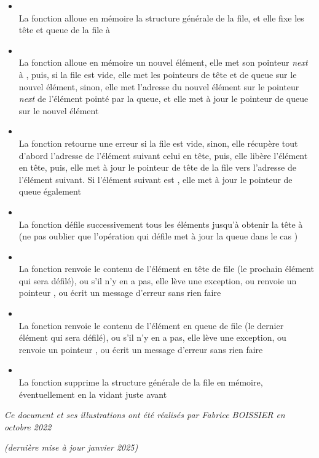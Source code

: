 \documentclass[11pt,a4paper]{article}
\begin{document}
\begin{itemize}
\item {}\\
      La fonction alloue en mémoire la structure générale de la file, et elle fixe les tête et queue de la file à 
\item {}\\
      La fonction alloue en mémoire un nouvel élément, elle met son pointeur \textit{next} à , puis, si la file est vide, elle met les pointeurs de tête et de queue sur le nouvel élément, sinon, elle met l'adresse du nouvel élément sur le pointeur \textit{next} de l'élément pointé par la queue, et elle met à jour le pointeur de queue sur le nouvel élément
\item {}\\
      La fonction retourne une erreur si la file est vide, sinon, elle récupère tout d'abord l'adresse de l'élément suivant celui en tête, puis, elle libère l'élément en tête, puis, elle met à jour le pointeur de tête de la file vers l'adresse de l'élément suivant. Si l'élément suivant est , elle met à jour le pointeur de queue également
\item {}\\
      La fonction défile successivement tous les éléments jusqu'à obtenir la tête à  (ne pas oublier que l'opération qui défile met à jour la queue dans le cas )
\item {}\\
      La fonction renvoie le contenu de l'élément en tête de file (le prochain élément qui sera défilé), ou s'il n'y en a pas, elle lève une exception, ou renvoie un pointeur , ou écrit un message d'erreur sans rien faire
\item {}\\
      La fonction renvoie le contenu de l'élément en queue de file (le dernier élément qui sera défilé), ou s'il n'y en a pas, elle lève une exception, ou renvoie un pointeur , ou écrit un message d'erreur sans rien faire
\item {}\\
      La fonction supprime la structure générale de la file en mémoire, éventuellement en la vidant juste avant
\end{itemize}



\bigskip

\vfillFirst

\vfillLast

\begin{center}
\textit{Ce document et ses illustrations ont été réalisés par Fabrice BOISSIER en octobre 2022}

\textit{(dernière mise à jour janvier 2025)}
\end{center}
\end{document}

